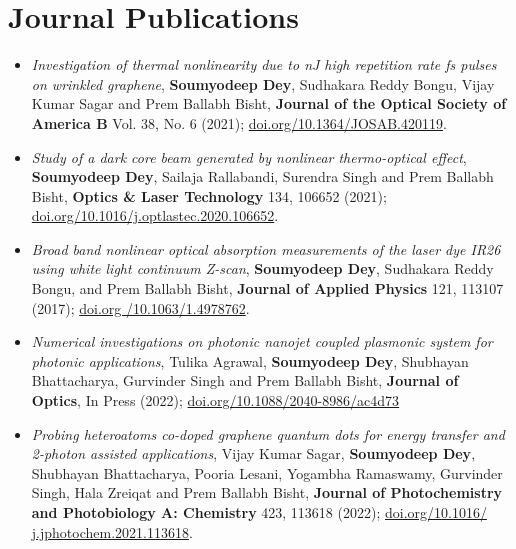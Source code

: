 \documentclass[11pt,a4paper,sans]{moderncv}        %
\begin{document}
\section{Journal Publications}
\begin{itemize}
	\item{\emph{Investigation of thermal nonlinearity due to nJ high repetition rate fs pulses on wrinkled graphene}, \textbf{Soumyodeep Dey}, Sudhakara Reddy Bongu, Vijay Kumar Sagar and Prem Ballabh Bisht, \textbf{Journal of the Optical Society of America B} Vol. 38, No. 6 (2021); \href{doi.org/10.1364/JOSAB.420119}{\color{blue}doi.org/10.1364/JOSAB.420119}.}
	
	\vspace{6pt}
	
	\item{\emph{Study of a dark core beam generated by nonlinear thermo-optical effect}, \textbf{Soumyodeep Dey}, Sailaja Rallabandi, Surendra Singh and Prem Ballabh Bisht, \textbf{Optics \& Laser Technology} 134, 106652 (2021); \href{doi.org/10.1016/j.optlastec.2020.106652}{\color{blue}doi.org/10.1016/j.optlastec.2020.106652}.}
	
	\vspace{6pt}
	
	\item{\emph{Broad band nonlinear optical absorption measurements of the laser dye IR26 using white light continuum Z-scan}, \textbf{Soumyodeep Dey}, Sudhakara Reddy Bongu, and Prem Ballabh Bisht, \textbf{Journal of Applied Physics} 121, 113107 (2017); \href{doi.org /10.1063/1.4978762}{\color{blue}doi.org /10.1063/1.4978762}.}

	\vspace{6pt}

	\item{\emph{Numerical investigations on photonic nanojet coupled plasmonic system for photonic applications}, Tulika Agrawal, \textbf{Soumyodeep Dey}, Shubhayan Bhattacharya, Gurvinder Singh and Prem Ballabh Bisht, \textbf{Journal of Optics}, In Press (2022); \href{https://doi.org/10.1088/2040-8986/ac4d73}{\color{blue}doi.org/10.1088/2040-8986/ac4d73}}

	
	\vspace{6pt}
	
	\item{\emph{Probing heteroatoms co-doped graphene quantum dots for energy transfer and 2-photon assisted applications}, Vijay Kumar Sagar, \textbf{Soumyodeep Dey}, Shubhayan Bhattacharya, Pooria Lesani, Yogambha Ramaswamy, Gurvinder Singh, Hala Zreiqat and Prem Ballabh Bisht, \textbf{Journal of Photochemistry and Photobiology A: Chemistry} 423, 113618 (2022); \href{https://doi.org/10.1016/j.jphotochem.2021.113618}{\color{blue}doi.org/10.1016/ j.jphotochem.2021.113618}.}
	

\end{itemize}
\end{document}
